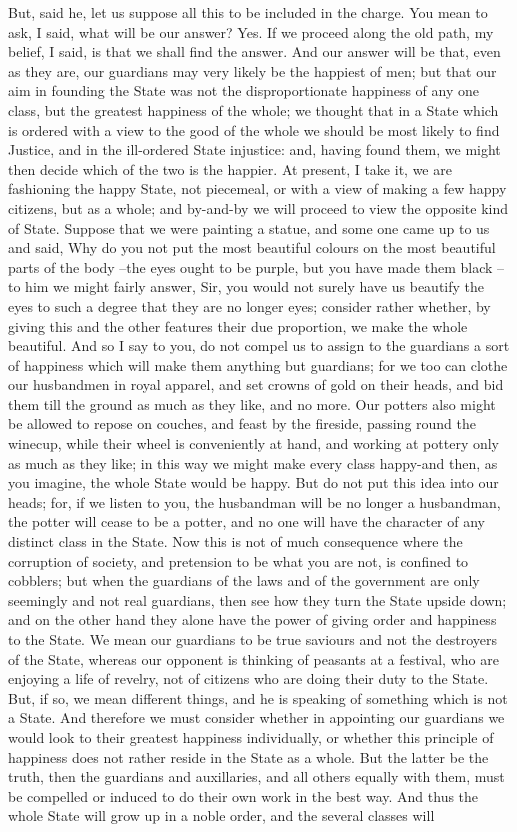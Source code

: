 But, said he, let us suppose all this to be included in the charge.
You mean to ask, I said, what will be our answer?
Yes.
If we proceed along the old path, my belief, I said, is that we shall find the answer. And our answer will be that, even as they are, our guardians may very likely be the happiest of men; but that our aim in founding the State was not the disproportionate happiness of any one class, but the greatest happiness of the whole; we thought that in a State which is ordered with a view to the good of the whole we should be most likely to find Justice, and in the ill-ordered State injustice: and, having found them, we might then decide which of the two is the happier. At present, I take it, we are fashioning the happy State, not piecemeal, or with a view of making a few happy citizens, but as a whole; and by-and-by we will proceed to view the opposite kind of State. Suppose that we were painting a statue, and some one came up to us and said, Why do you not put the most beautiful colours on the most beautiful parts of the body --the eyes ought to be purple, but you have made them black --to him we might fairly answer, Sir, you would not surely have us beautify the eyes to such a degree that they are no longer eyes; consider rather whether, by giving this and the other features their due proportion, we make the whole beautiful. And so I say to you, do not compel us to assign to the guardians a sort of happiness which will make them anything but guardians; for we too can clothe our husbandmen in royal apparel, and set crowns of gold on their heads, and bid them till the ground as much as they like, and no more. Our potters also might be allowed to repose on couches, and feast by the fireside, passing round the winecup, while their wheel is conveniently at hand, and working at pottery only as much as they like; in this way we might make every class happy-and then, as you imagine, the whole State would be happy. But do not put this idea into our heads; for, if we listen to you, the husbandman will be no longer a husbandman, the potter will cease to be a potter, and no one will have the character of any distinct class in the State. Now this is not of much consequence where the corruption of society, and pretension to be what you are not, is confined to cobblers; but when the guardians of the laws and of the government are only seemingly and not real guardians, then see how they turn the State upside down; and on the other hand they alone have the power of giving order and happiness to the State. We mean our guardians to be true saviours and not the destroyers of the State, whereas our opponent is thinking of peasants at a festival, who are enjoying a life of revelry, not of citizens who are doing their duty to the State. But, if so, we mean different things, and he is speaking of something which is not a State. And therefore we must consider whether in appointing our guardians we would look to their greatest happiness individually, or whether this principle of happiness does not rather reside in the State as a whole. But the latter be the truth, then the guardians and auxillaries, and all others equally with them, must be compelled or induced to do their own work in the best way. And thus the whole State will grow up in a noble order, and the several classes will 